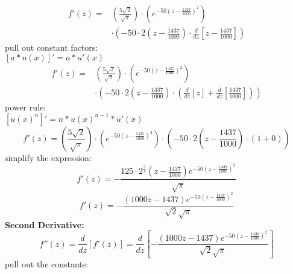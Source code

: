 \documentclass[12pt]{article}
\begin{document}
\begin{enumerate}[i.]
    \begin{equation}
        \begin{aligned}
            f'(z) = {}
            & \left (\frac{5 \sqrt{2}}{\sqrt{\pi}} \right ) \cdot \left (e^{-50(z-\frac{1437}{1000})^2} \right ) \\
            & \cdot \left ( -50 \cdot 2 \left (z - \frac{1437}{1000} \right ) \cdot \frac{d}{dz} \left [z-\frac{1437}{1000} \right ] \right )
        \end{aligned}
    \end{equation}
    pull out constant factors: \\
    $[a*u(x)]' = a*u'(x)$
    \begin{equation}
        \begin{aligned}
            f'(z) = {}
            & \left (\frac{5 \sqrt{2}}{\sqrt{\pi}} \right ) \cdot \left (e^{-50(z-\frac{1437}{1000})^2} \right ) \\
            & \cdot \left ( -50 \cdot 2 \left (z - \frac{1437}{1000} \right ) \cdot \left (\frac{d}{dz} \left [z \right ] + \frac{d}{dz} \left [\frac{1437}{1000} \right ] \right ) \right )
        \end{aligned}
    \end{equation}
    power rule: \\
    $[u(x)^n]' = n*u(x)^{n-1} * u'(x)$
    \begin{equation}
        f'(z) = \left (\frac{5 \sqrt{2}}{\sqrt{\pi}} \right ) \cdot \left (e^{-50(z-\frac{1437}{1000})^2} \right ) \cdot \left ( -50 \cdot 2 \left (z - \frac{1437}{1000} \right ) \cdot \left (1+0 \right ) \right )
    \end{equation}
    simplify the expression:
    \begin{equation}
        f'(z) = - \frac{125 \cdot 2^{\frac{5}{2}} \left ( z - \frac{1437}{1000}\right ) e^{-50\left (z-\frac{1437}{1000} \right )^2}}{\sqrt{\pi}}
    \end{equation}
    \begin{equation}
        f'(z) = - \frac{(1000z - 1437)e^{-50 \left (z-\frac{1437}{1000} \right )^2}}{\sqrt{2}\sqrt{\pi}}
    \end{equation}
    \setcounter{equation}{0}
    \textbf{Second Derivative:}
    \begin{equation}
        f''(z) = \frac{d}{dz}[f'(z)] = \frac{d}{dz} \left [- \frac{(1000z - 1437)e^{-50 \left (z-\frac{1437}{1000} \right )^2}}{\sqrt{2}\sqrt{\pi}} \right ]
    \end{equation}
    pull out the constants: \\

\end{enumerate}
\end{document}
